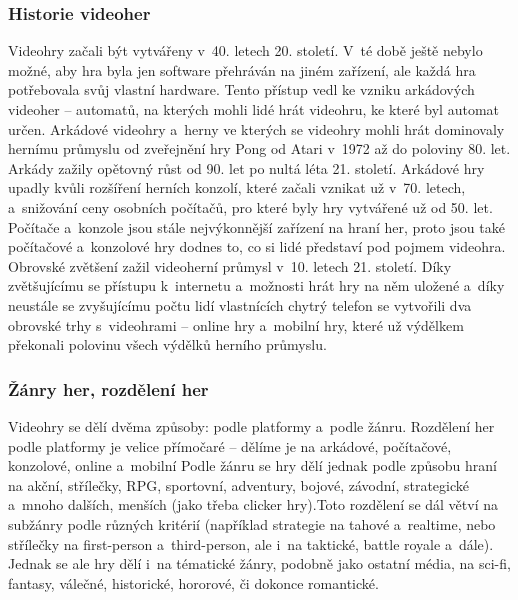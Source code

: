 \documentclass[a4paper]{extarticle}
\begin{document}
\subsubsection{Historie videoher}
Videohry začali být vytvářeny v~40. letech 20. století. V~té době ještě nebylo možné, aby hra byla jen software přehráván na jiném zařízení, ale každá hra potřebovala svůj vlastní hardware. Tento přístup vedl ke vzniku arkádových videoher – automatů, na kterých mohli lidé hrát videohru, ke které byl automat určen. Arkádové videohry a~herny ve kterých se videohry mohli hrát dominovaly hernímu průmyslu od zveřejnění hry Pong od Atari v~1972 až do poloviny 80. let. Arkády zažily opětovný růst od 90. let po nultá léta 21. století.
Arkádové hry upadly kvůli rozšíření herních konzolí, které začali vznikat už v~70. letech, a~snižování ceny osobních počítačů, pro které byly hry vytvářené už od 50. let. Počítače a~konzole jsou stále nejvýkonnější zařízení na hraní her, proto jsou také počítačové a~konzolové hry dodnes to, co si lidé představí pod pojmem videohra.
Obrovské zvětšení zažil videoherní průmysl v~10. letech 21. století. Díky zvětšujícímu se přístupu k~internetu a~možnosti hrát hry na něm uložené a~díky neustále se zvyšujícímu počtu lidí vlastnících chytrý telefon se vytvořili dva obrovské trhy s~videohrami – online hry a~mobilní hry, které už výdělkem překonali polovinu všech výdělků herního průmyslu. \cite{games_revenue}
\subsubsection{Žánry her, rozdělení her}
Videohry se dělí dvěma způsoby: podle platformy a~podle žánru.
Rozdělení her podle platformy je velice přímočaré – dělíme je na arkádové, počítačové, konzolové, online a~mobilní
Podle žánru se hry dělí jednak podle způsobu hraní na akční, střílečky, RPG, sportovní, adventury, bojové, závodní, strategické a~mnoho dalších, menších (jako třeba clicker hry).Toto rozdělení se dál větví na subžánry podle různých kritérií (například strategie na tahové a~realtime, nebo střílečky na first-person a~third-person, ale i~na taktické, battle royale a~dále). Jednak se ale hry dělí i~na tématické žánry, podobně jako ostatní média, na sci-fi, fantasy, válečné, historické, hororové, či dokonce romantické.
\end{document}
